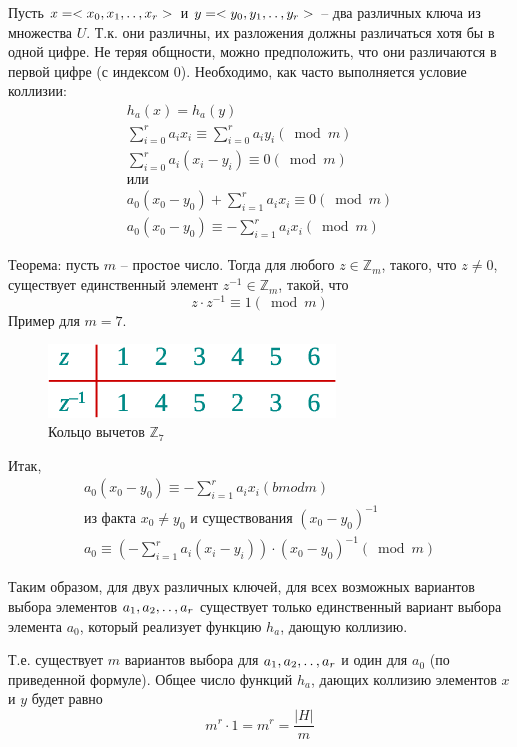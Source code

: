 \documentclass[11pt]{article}
\begin{document}
Пусть $x = <x_0, x_1, \mathinner{\ldotp\ldotp}, x_r>$ и $y = <y_0, y_1, \mathinner{\ldotp\ldotp}, y_r>$ -- два различных ключа из множества $U$. Т.к. они различны, их разложения должны различаться хотя бы в одной цифре. Не теряя общности, можно предположить, что они различаются в первой цифре (с индексом 0). Необходимо, как часто выполняется условие коллизии:
\begin{align*}
  h_a(x) = h_a(y) \\
  \sum_{i=0}^r a_i x_i \equiv \sum_{i=0}^r a_i y_i (\bmod m) \\
  \sum_{i=0}^r a_i(x_i - y_i) \equiv 0 (\bmod m) \\
  \text{или} \\
  a_0(x_0-y_0) + \sum_{i=1}^r a_i x_i \equiv 0 (\bmod m) \\
  a_0(x_0-y_0) \equiv - \sum_{i=1}^r a_i x_i (\bmod m)
\end{align*}

Теорема: пусть $m$ -- простое число. Тогда для любого $z \in \mathbb{Z}_m$, такого, что $z \neq 0$, существует единственный элемент $z^{-1} \in \mathbb{Z}_m$, такой, что
\begin{equation*}
  z \cdot z^{-1} \equiv 1 (\bmod m)
\end{equation*}
Пример для $m = 7$.
\begin{figure}[ht]
  \centering
  \includegraphics[width=3in]{lecture8/z7.eps}
  \caption{Кольцо вычетов $\mathbb{Z}_7$}
  \label{fig:z7}
\end{figure}

Итак, 
\begin{align*}
  a_0(x_0-y_0) \equiv - \sum_{i=1}^r a_i x_i (bmod m) \\
  \text{из факта } x_0 \neq y_0 \text{ и существования } (x_0 - y_0)^{-1} \\
  a_0 \equiv \left(-\sum_{i=1}^{r} a_i(x_i - y_i)\right)\cdot(x_0-y_0)^{-1} (\bmod m)
\end{align*}

Таким образом, для двух различных ключей, для всех возможных вариантов выбора элементов $a_1, a_2, \mathinner{\ldotp\ldotp}, a_r$ существует только единственный вариант выбора элемента $a_0$, который реализует функцию $h_a$, дающую коллизию.

Т.е. существует $m$ вариантов выбора для $a_1, a_2, \mathinner{\ldotp\ldotp}, a_r$ и один для $a_0$ (по приведенной формуле). Общее число функций $h_a$, дающих коллизию элементов $x$ и $y$ будет равно
\begin{equation*}
  m^r\cdot1 = m^r = \frac{|H|}{m}
\end{equation*}
\end{document}
